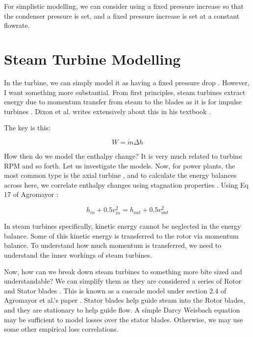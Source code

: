 \documentclass[masters]{ucbthesis}
\renewcommand{\_}{\kern-1.5pt\textunderscore\kern-1.5pt}
\begin{document}
For simplistic modelling, we can consider using a fixed pressure increase 
so that the condenser pressure is set, and a fixed pressure increase is 
set at a constant flowrate.

\section{Steam Turbine Modelling}

In the turbine, we can simply model it as having a fixed pressure drop 
\citep{zimmer2008modelling}. However, I want something more substantial.
From first principles, steam turbines extract energy due to momentum 
transfer from steam to the blades as it is for impulse turbines 
\citep{kareem2018design}. Dixon et al. writes extensively about this 
in his textbook \citep{dixon2013fluid}. 

The key is this:

\begin{equation*}
	W = \dot{m} \Delta h
\end{equation*}

How then do we model the enthalpy change? It is very much related
to turbine RPM and so forth. Let us investigate the models.
Now, for power plants, the most common type is the axial turbine 
\citep{agromayor2019preliminary}, and to calculate the energy balances
across here, we correlate enthalpy changes using stagnation properties 
\citep{agromayor2019preliminary}. Using Eq 17 of 
Agromayor \citep{agromayor2019preliminary}:


\begin{equation*}
	h_{in} + 0.5 v^2_{in} = h_{out} + 0.5 v^2_{out}
\end{equation*}

In steam turbines specifically, kinetic energy cannot 
be neglected in the energy balance. Some of this kinetic energy 
is transferred to the rotor via momentum balance. To understand how 
much momentum is transferred, we need to understand the inner workings 
of steam turbines.

Now, how can we break down steam turbines to something more bite sized 
and understandable? We can simplify them as they 
are considered a series of Rotor and Stator blades \citep{dixon2013fluid}.
This is known as a cascade model under section 2.4 of 
Agromayor et al.'s paper \citep{agromayor2019preliminary}.
Stator blades help guide steam into the Rotor blades, and they are stationary 
to help guide flow. A simple Darcy Weisbach equation may be sufficient to 
model losses over the stator blades. Otherwise, we may use some other 
empirical loss correlations.
\end{document}
